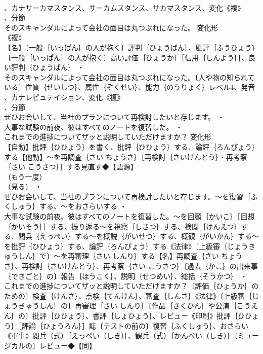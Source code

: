 \documentclass[8pt]{extreport}
\begin{document}
\begin{CJK}{UTF8}{min}
\\	、カナサーカマスタンス、サーカムスタンス、サカマスタンス、変化《複》
\\	、分節
\\	そのスキャンダルによって会社の面目は丸つぶれになった。	変化形 
\\	《複》
\\	【名】〔一般｛いっぱん｝の人が抱く〕評判｛ひょうばん｝、風評｛ふうひょう｝〔一般｛いっぱん｝の人が抱く〕高い評価｛ひょうか｝［信用｛しんよう｝］、良い評判｛ひょうばん｝ ・
\\	そのスキャンダルによって会社の面目は丸つぶれになった。〔人や物の知られている〕性質｛せいしつ｝、属性｛ぞくせい｝、能力｛のうりょく｝レベル4、発音
\\	、カナレピュテイション、変化《複》
\\	、分節
\\	ぜひお会いして、当社のプランについて再検討したいと存じます。 ・
\\	大事な試験の前夜、彼はすべてのノートを復習した。 ・
\\	これまでの進捗についてザッと説明していただけますか？	変化形 
\\	【自動】批評｛ひひょう｝を書く、批評｛ひひょう｝する、論評｛ろんぴょう｝する【他動】～を再調査｛さい ちょうさ｝［再検討｛さいけんとう｝・再考察｛さい こうさつ｝］する見直す◆【語源】
\\	（もう一度）
\\	（見る） ・
\\	ぜひお会いして、当社のプランについて再検討したいと存じます。～を復習｛ふくしゅう｝する、～をおさらいする ・
\\	大事な試験の前夜、彼はすべてのノートを復習した。～を回顧｛かいこ｝［回想｛かいそう｝］する、振り返る～を視察｛しさつ｝する、検閲｛けんえつ｝する、閲兵｛えっぺい｝する～を概説｛がいせつ｝する、概観｛がいかん｝する～を批評｛ひひょう｝する、論評｛ろんぴょう｝する《法律》〔上級審｛じょうきゅうしん｝で〕～を再審理｛さい しんり｝する【名】再調査｛さい ちょうさ｝、再検討｛さいけんとう｝、再考察｛さい こうさつ｝〔過去｛かこ｝の出来事｛できごと｝の〕報告｛ほうこく｝、説明｛せつめい｝、総括｛そうかつ｝ ・
\\	これまでの進捗についてザッと説明していただけますか？〔評価｛ひょうか｝のための〕検査｛けんさ｝、点検｛てんけん｝、審査｛しんさ｝《法律》〔上級審｛じょうきゅうしん｝の〕再審理｛さい しんり｝〔作品｛さくひん｝や公演｛こうえん｝の〕批評｛ひひょう｝、書評｛しょひょう｝、レビュー《印刷》批評｛ひひょう｝［評論｛ひょうろん｝］誌〔テストの前の〕復習｛ふくしゅう｝、おさらい《軍事》閲兵（式）｛えっぺい（しき）｝、観兵（式）｛かんぺい（しき）｝〔ミュージカルの〕レビュー◆【同】

\end{CJK}
\end{document}
